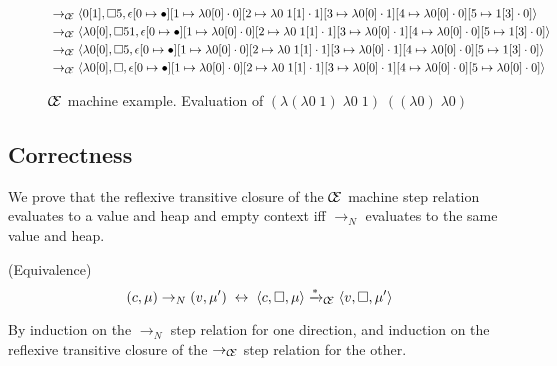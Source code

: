 \begin{figure}
\begin{align*}
&\rightarrow_{\mathcal{\mathcal{C} \mskip -4mu \mathcal{E}}}\langle 0[1],\square 5,\epsilon[0\mapsto\bullet][1\mapsto\lambda0[0]\cdot0][2\mapsto\lambda0\;1[1]\cdot1][3\mapsto\lambda0[0]\cdot1][4\mapsto\lambda0[0]\cdot0][5\mapsto1[3]\cdot0]\rangle\\ 
&\rightarrow_{\mathcal{\mathcal{C} \mskip -4mu \mathcal{E}}}\langle \lambda0[0],\square 5 1,\epsilon[0\mapsto\bullet][1\mapsto\lambda0[0]\cdot0][2\mapsto\lambda0\;1[1]\cdot1][3\mapsto\lambda0[0]\cdot1][4\mapsto\lambda0[0]\cdot0][5\mapsto1[3]\cdot0]\rangle\\ 
&\rightarrow_{\mathcal{\mathcal{C} \mskip -4mu \mathcal{E}}}\langle \lambda0[0],\square 5,\epsilon[0\mapsto\bullet][1\mapsto\lambda0[0]\cdot0][2\mapsto\lambda0\;1[1]\cdot1][3\mapsto\lambda0[0]\cdot1][4\mapsto\lambda0[0]\cdot0][5\mapsto1[3]\cdot0]\rangle\\ 
&\rightarrow_{\mathcal{\mathcal{C} \mskip -4mu \mathcal{E}}}\langle \lambda0[0],\square,\epsilon[0\mapsto\bullet][1\mapsto\lambda0[0]\cdot0][2\mapsto\lambda0\;1[1]\cdot1][3\mapsto\lambda0[0]\cdot1][4\mapsto\lambda0[0]\cdot0][5\mapsto\lambda0[0]\cdot0]\rangle\\ 
\end{align*}
\caption{$\mathcal{\mathcal{C} \mskip -4mu \mathcal{E}}$ machine example.
Evaluation of $(\lambda(\lambda0\;1)\;\lambda0\;1)\;((\lambda0)\;\lambda0)$}
\label{fig:state}
\end{figure}

\subsection{Correctness}
We prove that the reflexive transitive closure of the $\mathcal{\mathcal{C} \mskip -4mu \mathcal{E}}$ machine
step relation evaluates to a value and heap and empty context iff
$\xrightarrow{}_{N}$ evaluates to the same value and heap.

{\theorem \textnormal{(Equivalence)} $$(c, \mu) \rightarrow_{N} (v, \mu') \;
\leftrightarrow \; \langle c, \square, \mu \rangle \xrightarrow{*
}_{\mathcal{\mathcal{C} \mskip -4mu \mathcal{E}}} \langle v, \square, \mu' \rangle $$} 

By induction on the $\rightarrow_{N}$ step relation for one direction, and
induction on the reflexive transitive closure of the
$\rightarrow_{\mathcal{\mathcal{C} \mskip -4mu \mathcal{E}}}$ step relation for
the other.

